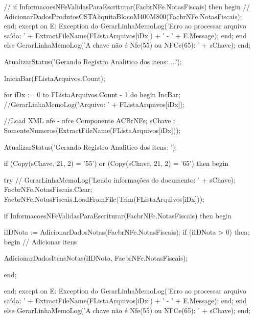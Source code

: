                 //  if InformacoesNFeValidasParaEscriturar(FacbrNFe.NotasFiscais) then
                     begin
//
                       AdicionarDadosProdutosCSTAliquitaBlocoM400M800(FacbrNFe.NotasFiscais);
                     end;
               except
                  on E: Exception do
                     GerarLinhaMemoLog('Erro ao processar arquivo saída: ' + ExtractFileName(FListaArquivos[iDx]) + ' - ' + E.Message);
               end;
            end
         else
           GerarLinhaMemoLog('A chave não é Nfe(55) ou NFCe(65): ' + sChave);
      end;


   AtualizarStatus('Gerando Registro Analitico dos itens: ...');

   IniciaBar(FListaArquivos.Count);

   for iDx := 0 to FListaArquivos.Count - 1 do
      begin
         IncBar;
         //GerarLinhaMemoLog('Arquivo: ' + FListaArquivos[iDx]);


         //Load XML nfe - nfce Componente ACBrNFe;
         sChave := SomenteNumeros(ExtractFileName(FListaArquivos[iDx]));

         AtualizarStatus('Gerando Registro Analitico dos itens: ');

         if (Copy(sChave, 21, 2) = '55') or (Copy(sChave, 21, 2) = '65') then
            begin

               try
                //  GerarLinhaMemoLog('Lendo informações do documento: ' + sChave);
                  FacbrNFe.NotasFiscais.Clear;
                  FacbrNFe.NotasFiscais.LoadFromFile(Trim(FListaArquivos[iDx]));

                  if InformacoesNFeValidasParaEscriturar(FacbrNFe.NotasFiscais) then
                     begin

                        iIDNota := AdicionarDadosNotas(FacbrNFe.NotasFiscais);
                        if (iIDNota > 0) then;
                           begin
                              // Adicionar itens

                              AdicionarDadosItensNotas(iIDNota, FacbrNFe.NotasFiscais);

                           end;

                     end;
               except
                  on E: Exception do
                     GerarLinhaMemoLog('Erro ao processar arquivo saída: ' + ExtractFileName(FListaArquivos[iDx]) + ' - ' + E.Message);
               end;
            end
         else
           GerarLinhaMemoLog('A chave não é Nfe(55) ou NFCe(65): ' + sChave);
      end;

